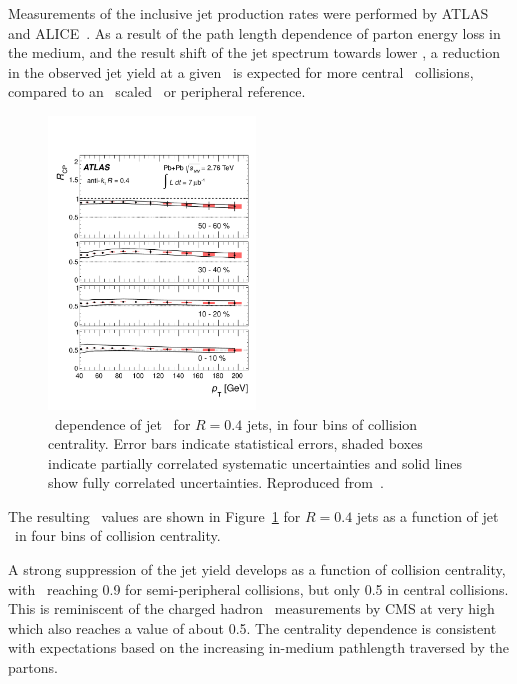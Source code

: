 Measurements of the inclusive jet production rates were performed by ATLAS~\cite{Aad:2012is} and 
ALICE~\cite{Abelev:2013kqa}.
As a result of the path length dependence of parton energy loss in the medium, and 
the result shift of the jet spectrum towards lower \pT,
a reduction in the observed jet yield at a given \pT\ is expected for more 
central \PbPb\ collisions, compared to an \Ncoll\ scaled \pp\ or peripheral reference.

\begin{figure}[!th]
\begin{center}
\includegraphics[width=0.49\textwidth]{jetfigures/ATLAS_jetRCP_04.pdf}
\caption{
\pT\ dependence of jet \Rcp\ for  $R=0.4$ jets,
in four bins of collision centrality. Error bars indicate
statistical errors,  shaded boxes indicate partially 
correlated systematic uncertainties and
solid lines show fully correlated uncertainties. Reproduced from~\cite{Aad:2012is}.}
\label{fig:GR:rcprfour}
\end{center}
\end{figure}
The resulting \Rcp\ values are shown in Figure~\ref{fig:GR:rcprfour}
for $R=0.4$ jets as a function of jet \pT\ in four bins of collision centrality.

A strong suppression of the jet yield develops as a function
of collision centrality, with \Rcp\ reaching 0.9 for semi-peripheral
collisions, but only 0.5 in central collisions.  This is reminiscent
of the charged hadron \Raa\ measurements by CMS at very high \pT\, which 
also reaches a value of about 0.5.
The centrality dependence is consistent with expectations based on the increasing 
in-medium pathlength traversed by the partons. 


